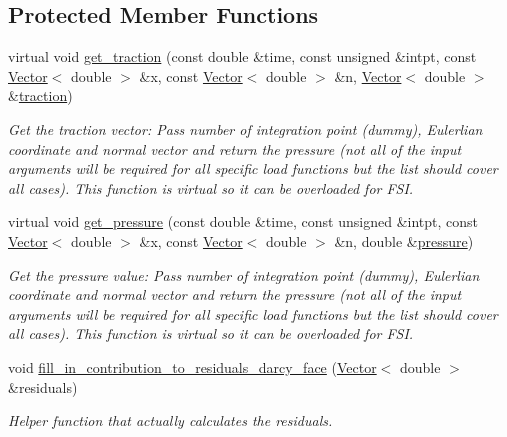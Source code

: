 \subsection*{Protected Member Functions}
\begin{DoxyCompactItemize}
\item 
virtual void \hyperlink{classoomph_1_1PoroelasticityFaceElement_ada36786b5d21bf6c024a8f5344bae84e}{get\+\_\+traction} (const double \&time, const unsigned \&intpt, const \hyperlink{classoomph_1_1Vector}{Vector}$<$ double $>$ \&x, const \hyperlink{classoomph_1_1Vector}{Vector}$<$ double $>$ \&n, \hyperlink{classoomph_1_1Vector}{Vector}$<$ double $>$ \&\hyperlink{classoomph_1_1PoroelasticityFaceElement_a1e82041ba48cda7bc31aa65165cf8208}{traction})
\begin{DoxyCompactList}\small\item\em Get the traction vector\+: Pass number of integration point (dummy), Eulerlian coordinate and normal vector and return the pressure (not all of the input arguments will be required for all specific load functions but the list should cover all cases). This function is virtual so it can be overloaded for F\+SI. \end{DoxyCompactList}\item 
virtual void \hyperlink{classoomph_1_1PoroelasticityFaceElement_adac5f074dfe38b1aa402601507f940b4}{get\+\_\+pressure} (const double \&time, const unsigned \&intpt, const \hyperlink{classoomph_1_1Vector}{Vector}$<$ double $>$ \&x, const \hyperlink{classoomph_1_1Vector}{Vector}$<$ double $>$ \&n, double \&\hyperlink{classoomph_1_1PoroelasticityFaceElement_af0ecc8b5c372d479f9ba46892a21e955}{pressure})
\begin{DoxyCompactList}\small\item\em Get the pressure value\+: Pass number of integration point (dummy), Eulerlian coordinate and normal vector and return the pressure (not all of the input arguments will be required for all specific load functions but the list should cover all cases). This function is virtual so it can be overloaded for F\+SI. \end{DoxyCompactList}\item 
void \hyperlink{classoomph_1_1PoroelasticityFaceElement_ac399e61815a50cd59aaee283464fcc09}{fill\+\_\+in\+\_\+contribution\+\_\+to\+\_\+residuals\+\_\+darcy\+\_\+face} (\hyperlink{classoomph_1_1Vector}{Vector}$<$ double $>$ \&residuals)
\begin{DoxyCompactList}\small\item\em Helper function that actually calculates the residuals. \end{DoxyCompactList}\end{DoxyCompactItemize}
